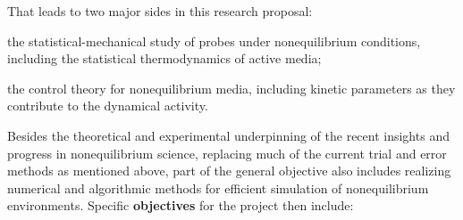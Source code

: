 That leads to two major sides in this research proposal:
\begin{inparaenum}[A.]
\item the statistical-mechanical study of probes under nonequilibrium conditions, including
the statistical thermodynamics of active media;
\item the control theory for nonequilibrium media, including kinetic parameters as they
contribute to the dynamical activity.
\end{inparaenum}
Besides the theoretical and experimental underpinning of the recent insights and progress in
nonequilibrium science, replacing much of the current trial and error methods as mentioned
above, part of the general objective also includes realizing numerical and algorithmic
methods for efficient simulation of nonequilibrium environments. Specific {\bf objectives}
for the project then include:
